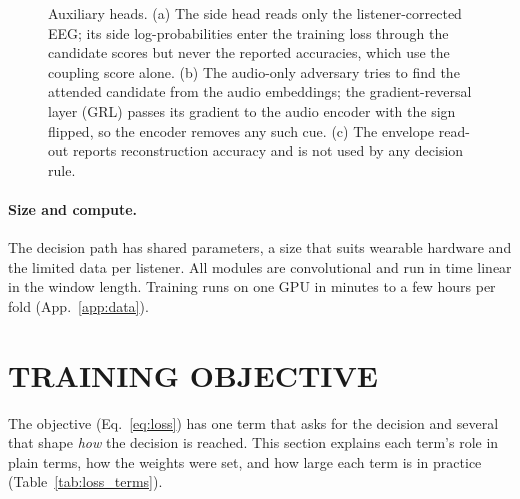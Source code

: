 \documentclass[twoside]{article}
\begin{document}
\begin{figure}[t]\centering
\resizebox{\textwidth}{!}{}
\caption{Auxiliary heads. (a) The side head reads only the listener-corrected EEG; its side
log-probabilities enter the training loss through the candidate scores but never the
reported accuracies, which use the coupling score alone. (b) The audio-only adversary tries
to find the attended candidate from the audio embeddings; the gradient-reversal layer (GRL)
passes its gradient to the audio encoder with the sign flipped, so the encoder removes any
such cue. (c) The envelope read-out reports reconstruction accuracy and is not used by any
decision rule.}\label{fig:net_aux}
\end{figure}

\paragraph{Size and compute.} The decision path has \archDecision{} shared parameters, a
size that suits wearable hardware and the limited data per listener. All modules are convolutional and run in time linear in the
window length. Training runs on one GPU in minutes to a few hours per fold
(App.~\ref{app:data}).

\section{TRAINING OBJECTIVE}\label{app:loss}
The objective (Eq.~\ref{eq:loss}) has one term that asks for the decision and several that
shape \emph{how} the decision is reached. This section explains each term's role in plain
terms, how the weights were set, and how large each term is in practice
(Table~\ref{tab:loss_terms}).
\end{document}
